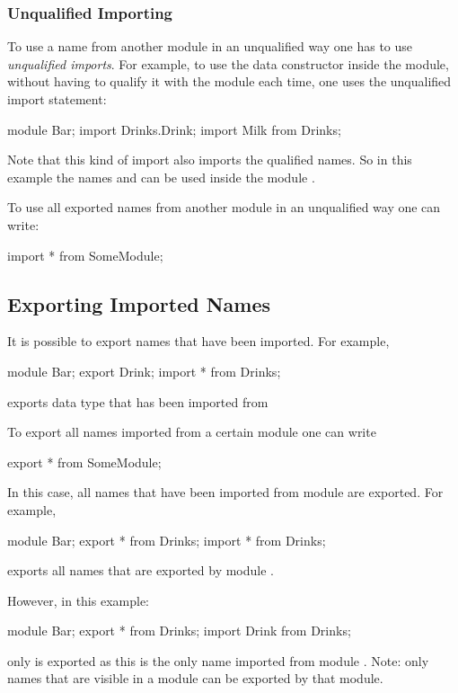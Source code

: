 \subsubsection{Unqualified Importing}
To use a name from another module in an unqualified way one has to use \emph{unqualified imports}.
For example, to use the  data constructor inside the  module, without having to qualify it with the  module each time, one uses the unqualified import statement:
\begin{abscode}
module Bar;
import Drinks.Drink;  
import Milk from Drinks;
\end{abscode}
Note that this kind of import also imports the qualified names. 
So in this example the names  and  can be used inside the module .

To use all exported names from another module in an unqualified way one can write:
\begin{abscode}
import * from SomeModule;
\end{abscode}

\subsection{Exporting Imported Names}
It is possible to export names that have been imported. For example,
\begin{abscode}
module Bar;
export Drink;
import * from Drinks;
\end{abscode}
exports data type  that has been imported from 

To export all names imported from a certain module one can write
\begin{abscode}
export * from SomeModule;
\end{abscode}
In this case, all names that have been imported from module  are exported. For example,
\begin{abscode}
module Bar;
export * from Drinks;
import * from Drinks;
\end{abscode}
exports all names that are exported by module .

However, in this example:
\begin{abscode}
module Bar;
export * from Drinks;
import Drink from Drinks;
\end{abscode}
only  is exported as this is the only name imported from module .
Note: only names that are visible in a module can be exported by that module.

